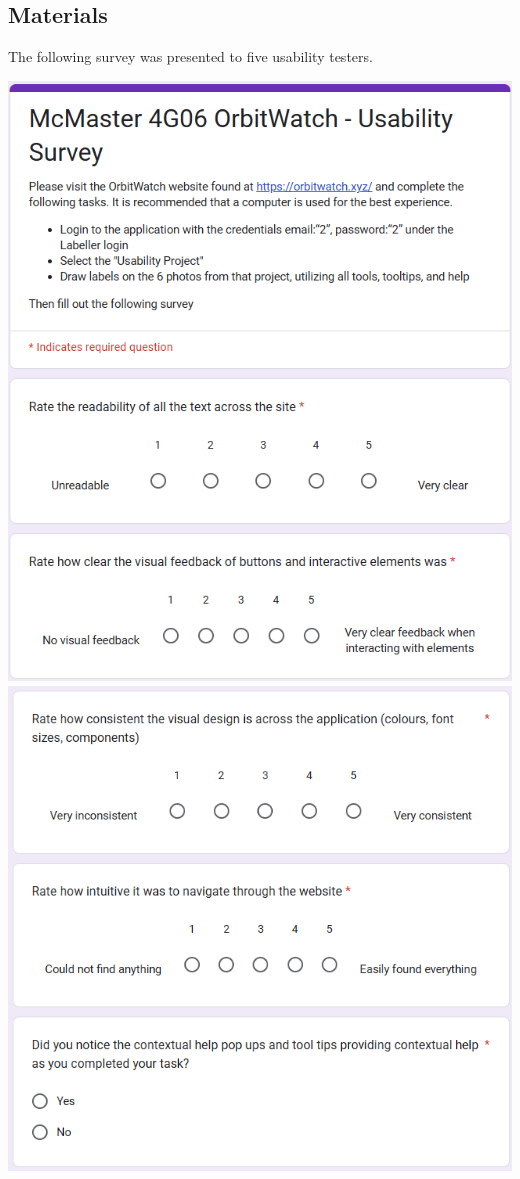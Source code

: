 \documentclass[12pt, titlepage]{article}
\begin{document}
\subsection{Materials}
The following survey was presented to five usability testers. 
\begin{centering}
\includegraphics[scale=0.7]{Survey (3).png}\\
\includegraphics[scale=0.7]{Survey (4).png}\\

\end{centering}
\end{document}
